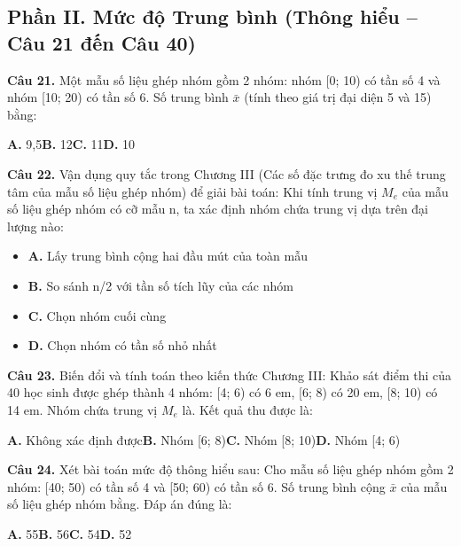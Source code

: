 \documentclass[11pt,a4paper]{article}
\begin{document}
\subsection*{\color{accent} Phần II. Mức độ Trung bình (Thông hiểu -- Câu 21 đến Câu 40)}
\textbf{\color{primary} Câu 21.} Một mẫu số liệu ghép nhóm gồm 2 nhóm: nhóm [0; 10) có tần số 4 và nhóm [10; 20) có tần số 6. Số trung bình $\bar{x}$ (tính theo giá trị đại diện 5 và 15) bằng:\par
\hspace*{1.5em}\textbf{A.} 9,5\quad\quad \textbf{B.} 12\quad\quad \textbf{C.} 11\quad\quad \textbf{D.} 10\par\vspace{2pt}
\textbf{\color{primary} Câu 22.} Vận dụng quy tắc trong Chương III (Các số đặc trưng đo xu thế trung tâm của mẫu số liệu ghép nhóm) để giải bài toán: Khi tính trung vị $M_e$ của mẫu số liệu ghép nhóm có cỡ mẫu n, ta xác định nhóm chứa trung vị dựa trên đại lượng nào:\par
\begin{itemize}\setlength{\itemsep}{1pt}\setlength{\parskip}{0pt}
  \item[] \textbf{A.} Lấy trung bình cộng hai đầu mút của toàn mẫu
  \item[] \textbf{B.} So sánh n/2 với tần số tích lũy của các nhóm
  \item[] \textbf{C.} Chọn nhóm cuối cùng
  \item[] \textbf{D.} Chọn nhóm có tần số nhỏ nhất
\end{itemize}\vspace{2pt}
\textbf{\color{primary} Câu 23.} Biến đổi và tính toán theo kiến thức Chương III: Khảo sát điểm thi của 40 học sinh được ghép thành 4 nhóm: [4; 6) có 6 em, [6; 8) có 20 em, [8; 10) có 14 em. Nhóm chứa trung vị $M_e$ là. Kết quả thu được là:\par
\hspace*{1.5em}\textbf{A.} Không xác định được\quad\quad \textbf{B.} Nhóm [6; 8)\quad\quad \textbf{C.} Nhóm [8; 10)\quad\quad \textbf{D.} Nhóm [4; 6)\par\vspace{2pt}
\textbf{\color{primary} Câu 24.} Xét bài toán mức độ thông hiểu sau: Cho mẫu số liệu ghép nhóm gồm 2 nhóm: [40; 50) có tần số 4 và [50; 60) có tần số 6. Số trung bình cộng $\bar{x}$ của mẫu số liệu ghép nhóm bằng. Đáp án đúng là:\par
\hspace*{1.5em}\textbf{A.} 55\quad\quad \textbf{B.} 56\quad\quad \textbf{C.} 54\quad\quad \textbf{D.} 52\par\vspace{2pt}
\end{document}
